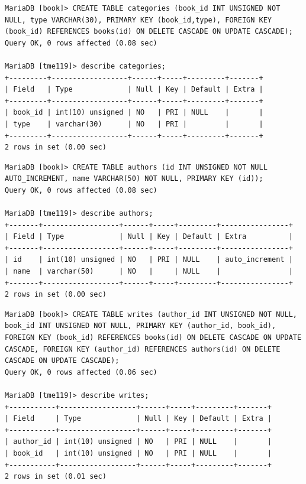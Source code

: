 \documentclass{assignment}
\begin{document}
\begin{verbatim}
MariaDB [book]> CREATE TABLE categories (book_id INT UNSIGNED NOT NULL, type VARCHAR(30), PRIMARY KEY (book_id,type), FOREIGN KEY (book_id) REFERENCES books(id) ON DELETE CASCADE ON UPDATE CASCADE);
Query OK, 0 rows affected (0.08 sec)

MariaDB [tme119]> describe categories;
+---------+------------------+------+-----+---------+-------+
| Field   | Type             | Null | Key | Default | Extra |
+---------+------------------+------+-----+---------+-------+
| book_id | int(10) unsigned | NO   | PRI | NULL    |       |
| type    | varchar(30)      | NO   | PRI |         |       |
+---------+------------------+------+-----+---------+-------+
2 rows in set (0.00 sec)
\end{verbatim}

\begin{verbatim}
MariaDB [book]> CREATE TABLE authors (id INT UNSIGNED NOT NULL AUTO_INCREMENT, name VARCHAR(50) NOT NULL, PRIMARY KEY (id));
Query OK, 0 rows affected (0.08 sec)

MariaDB [tme119]> describe authors;
+-------+------------------+------+-----+---------+----------------+
| Field | Type             | Null | Key | Default | Extra          |
+-------+------------------+------+-----+---------+----------------+
| id    | int(10) unsigned | NO   | PRI | NULL    | auto_increment |
| name  | varchar(50)      | NO   |     | NULL    |                |
+-------+------------------+------+-----+---------+----------------+
2 rows in set (0.00 sec)

\end{verbatim}


\begin{verbatim}
MariaDB [book]> CREATE TABLE writes (author_id INT UNSIGNED NOT NULL, book_id INT UNSIGNED NOT NULL, PRIMARY KEY (author_id, book_id), FOREIGN KEY (book_id) REFERENCES books(id) ON DELETE CASCADE ON UPDATE CASCADE, FOREIGN KEY (author_id) REFERENCES authors(id) ON DELETE CASCADE ON UPDATE CASCADE);
Query OK, 0 rows affected (0.06 sec)

MariaDB [tme119]> describe writes;
+-----------+------------------+------+-----+---------+-------+
| Field     | Type             | Null | Key | Default | Extra |
+-----------+------------------+------+-----+---------+-------+
| author_id | int(10) unsigned | NO   | PRI | NULL    |       |
| book_id   | int(10) unsigned | NO   | PRI | NULL    |       |
+-----------+------------------+------+-----+---------+-------+
2 rows in set (0.01 sec)
\end{verbatim}
\end{document}
